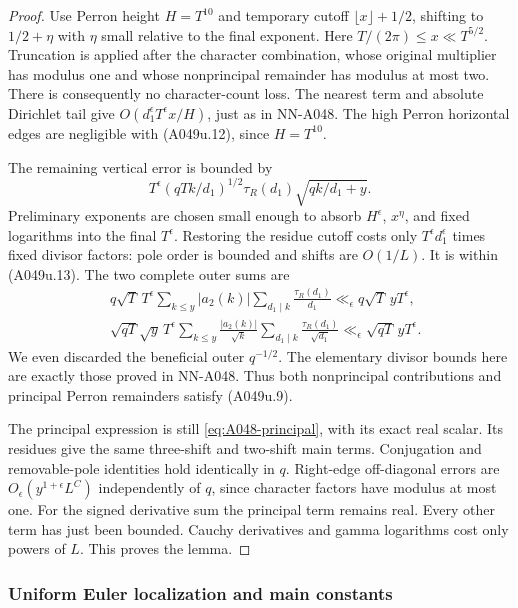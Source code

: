 \begin{proof}
Use Perron height $H=T^{10}$ and temporary cutoff
$\lfloor x\rfloor+1/2$, shifting to $1/2+\eta$ with
$\eta$ small relative to the final exponent.
Here $T/(2\pi)\le x\ll T^{5/2}$.
Truncation is applied after the character combination,
whose original multiplier has modulus one and whose
nonprincipal remainder has modulus at most two.
There is consequently no character-count loss.
The nearest term and absolute Dirichlet tail give
$O(d_1^\epsilon T^\epsilon x/H)$, just as in NN-A048.
The high Perron horizontal edges are negligible with
(A049u.12), since $H=T^{10}$.

The remaining vertical error is bounded by
\[
 T^\epsilon(qTk/d_1)^{1/2}\tau_R(d_1)
                                  \sqrt{qk/d_1+y}.
\tag{A049u.13}
\]
Preliminary exponents are chosen small enough to absorb
$H^\epsilon$, $x^\eta$, and fixed logarithms into the
final $T^\epsilon$. Restoring the residue cutoff costs
only $T^\epsilon d_1^\epsilon$ times fixed divisor
factors: pole order is bounded and shifts are $O(1/L)$.
It is within (A049u.13). The two complete outer sums are
\[
\begin{aligned}
&q\sqrt T\,T^\epsilon
 \sum_{k\le y}|a_2(k)|\sum_{d_1\mid k}\frac{\tau_R(d_1)}{d_1}
          \ll_\epsilon q\sqrt T\,yT^\epsilon,\\
&\sqrt{qT}\sqrt y\,T^\epsilon
 \sum_{k\le y}\frac{|a_2(k)|}{\sqrt k}
       \sum_{d_1\mid k}\frac{\tau_R(d_1)}{\sqrt{d_1}}
          \ll_\epsilon\sqrt{qT}\,yT^\epsilon .
\end{aligned}
\tag{A049u.14}
\]
We even discarded the beneficial outer $q^{-1/2}$.
The elementary divisor bounds here are exactly those
proved in NN-A048. Thus both nonprincipal contributions
and principal Perron remainders satisfy (A049u.9).

The principal expression is still
\eqref{eq:A048-principal}, with its exact real scalar.
Its residues give the same three-shift and two-shift
main terms. Conjugation and removable-pole identities
hold identically in $q$. Right-edge off-diagonal errors
are $O_\epsilon(y^{1+\epsilon}L^C)$ independently of $q$,
since character factors have modulus at most one.
For the signed derivative sum the principal term remains
real. Every other term has just been bounded.
Cauchy derivatives and gamma logarithms cost only powers
of $L$. This proves the lemma.
\end{proof}

\subsubsection*{Uniform Euler localization and main constants}

